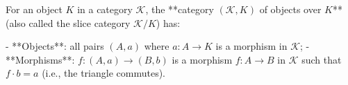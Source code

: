 For an object $K$ in a category $\mathcal{K}$, the **category $(\mathcal{K}, K)$ of objects over $K$** (also called the slice category $\mathcal{K}/K$) has:

- **Objects**: all pairs $(A, a)$ where $a: A \rightarrow K$ is a morphism in $\mathcal{K}$;
- **Morphisms**: $f: (A, a) \rightarrow (B, b)$ is a morphism $f: A \rightarrow B$ in $\mathcal{K}$ such that $f \cdot b = a$ (i.e., the triangle commutes).
